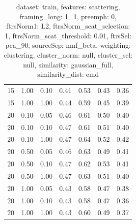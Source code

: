 \begin{table}
\begin{center}
\begin{tabular}{lllcccc}
15 & 1.00 & 0.10 & 0.41 & 0.53 & 0.43 & 0.36 \\ 
15 & 1.00 & 1.00 & 0.44 & 0.59 & 0.45 & 0.39 \\ 
20 & 0.10 & 0.05 & 0.46 & 0.61 & 0.50 & 0.40 \\ 
20 & 0.10 & 0.10 & 0.47 & 0.61 & 0.51 & 0.40 \\ 
20 & 0.10 & 1.00 & 0.47 & 0.64 & 0.52 & 0.42 \\ 
20 & 0.50 & 0.05 & 0.46 & 0.63 & 0.49 & 0.41 \\ 
20 & 0.50 & 0.10 & 0.47 & 0.62 & 0.53 & 0.41 \\ 
20 & 0.50 & 1.00 & 0.47 & 0.63 & 0.51 & 0.40 \\ 
20 & 1.00 & 0.05 & 0.43 & 0.58 & 0.47 & 0.38 \\ 
20 & 1.00 & 0.10 & 0.43 & 0.58 & 0.47 & 0.36 \\ 
20 & 1.00 & 1.00 & 0.43 & 0.60 & 0.49 & 0.37 \\ 
\end{tabular} 
\end{center} 
\caption{dataset: train, features: scattering, framing\_long: 1\_1, preemph: 0, ftrsNorm1: L2, ftrsNorm\_scat\_selection: 1, ftrsNorm\_scat\_threshold: 0.01, ftrsSel: pca\_90, sourceSep: nmf\_beta, weighting: clustering, cluster\_norm: null, cluster\_sel: null, similarity: gaussian\_full, similarity\_dist: emd} 
\label{datasetrFeaturscFraminlong1_1Preemp0Ftrsnorm1L2Ftrsnoscatselect1Ftrsnoscatthresh0.01Ftrsselpc90SourcesepnmbeWeightclClustenormnuClusteselnuSimilagafuSimiladistem} 
\end{table} 
 
